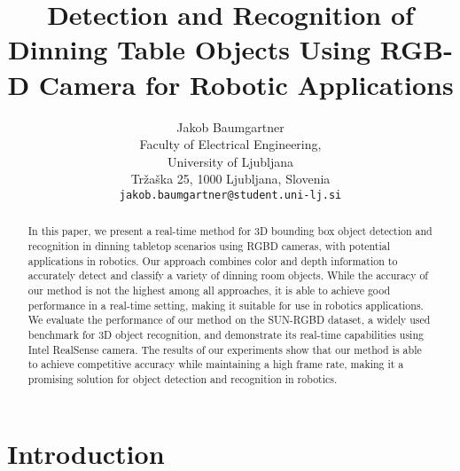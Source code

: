 \documentclass[10pt,twocolumn,letterpaper]{article}
\begin{document}
\title{Detection and Recognition of Dinning Table Objects Using RGB-D Camera for Robotic Applications}

\author{Jakob Baumgartner\\
Faculty of Electrical Engineering,\\
University of Ljubljana\\
Tržaška 25, 1000 Ljubljana, Slovenia\\
{\tt\small jakob.baumgartner@student.uni-lj.si}
}

\maketitle
\ificcvfinal\thispagestyle{empty}\fi

\begin{abstract}
In this paper, we present a real-time method for 3D bounding box object detection and recognition in dinning tabletop scenarios using RGBD cameras, with potential applications in robotics. Our approach combines color and depth information to accurately detect and classify a variety of dinning room objects. While the accuracy of our method is not the highest among all approaches, it is able to achieve good performance in a real-time setting, making it suitable for use in robotics applications. We evaluate the performance of our method on the SUN-RGBD dataset, a widely used benchmark for 3D object recognition, and demonstrate its real-time capabilities using Intel RealSense camera. The results of our experiments show that our method is able to achieve competitive accuracy while maintaining a high frame rate, making it a promising solution for object detection and recognition in robotics.
\end{abstract}

\section{Introduction}
\end{document}

